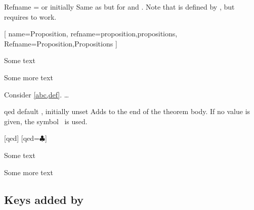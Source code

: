 \documentclass{ltxdoc}
\begin{document}
\begin{docKey}{Refname}
  {= \textrm{or} }
  {initially }
Same as  but for  and . Note that  is defined by , but requires  to work.

\begin{tcbwritetemp}
[
  name=Proposition,
  refname={proposition,propositions},
  Refname={Proposition,Propositions}
  ]
\end{tcbwritetemp}

\begin{keythmscode}[withpreamble]
\begin{prop}[label=abc]
Some text
\end{prop}
\begin{prop}[label=def]
Some more text
\end{prop}
\begin{theorem}
Consider \cref{abc,def}.
 \dots
\end{theorem}
\end{keythmscode}

\end{docKey}

\begin{docKey}{qed}
  {}
  {default , initially unset}
Adds  to the end of the theorem body. If no value is given, the symbol \openbox\ is used.

\begin{tcbwritetemp}
[qed]
[qed=$\clubsuit$]
\end{tcbwritetemp}

\begin{keythmscode}[withpreamble]
\begin{example}
Some text
\end{example}
\begin{solution}
Some more text
\end{solution}
\end{keythmscode}

\end{docKey}

\subsection{Keys added by } \label{thm-added-keys}
\end{document}
